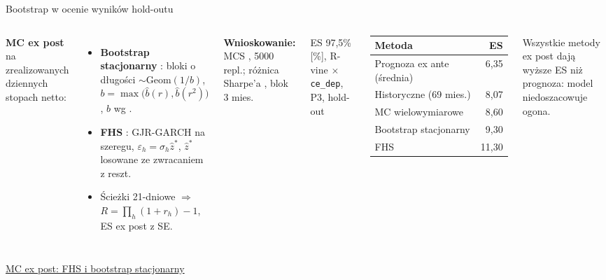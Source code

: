 \documentclass[aspectratio=169,11pt]{beamer}
\newcommand{\repo}{https://github.com/michalmarchwiak/bsc-project}
\newcommand{\rev}{9e941db56fde866672b262f5f6725268ce58feb7}
\newcommand{\src}[2]{\vfill{\scriptsize\color{Teal}%
  \href{\repo/blob/\rev/#1}{#2}}}
\begin{document}
\begin{frame}{Bootstrap w ocenie wyników hold-outu}
  \begin{columns}[T,onlytextwidth]
    \textbf{MC ex post} na zrealizowanych dziennych stopach netto:
    \begin{itemize}
      \item \textbf{Bootstrap stacjonarny} \citep{politis1994}: bloki
        o długości \(\sim\mathrm{Geom}(1/b)\),
        \(b=\max\bigl(\hat b(r),\hat b(r^2)\bigr)\),
        \(\hat b\) wg \citet{politis2004}.
      \item \textbf{FHS} \citep{barone1999}: GJR-GARCH na szeregu, \(\varepsilon_h=\sigma_h\hat z^*\),
        \(\hat z^*\) losowane ze zwracaniem z reszt.
      \item Ścieżki 21-dniowe \(\Rightarrow\)
        \(R=\prod_h(1+r_h)-1\), ES ex post z SE.
    \end{itemize}
    {\small\textbf{Wnioskowanie:} MCS \citep{hansen2011}, 5000 repl.;
    różnica Sharpe'a \citep{ledoit2008}, blok 3 mies.\par}
    \centering
    {\small ES 97,5\% [\%], R-vine \(\times\) \texttt{ce\_dep}, P3, hold-out}\par
    \smallskip
    \begin{tabular}{lr}
      \toprule
      Metoda & ES\\
      \midrule
      Prognoza ex ante (średnia) & 6,35\\
      Historyczne (69 mies.)     & 8,07\\
      MC wielowymiarowe          & 8,60\\
      Bootstrap stacjonarny      & 9,30\\
      FHS                        & 11,30\\
      \bottomrule
    \end{tabular}\par
    \smallskip
    \raggedright{\small Wszystkie metody ex post dają wyższe ES
      niż prognoza: model niedoszacowuje ogona.}
  \end{columns}
  \src{src/pf/backtest/expost_mc.py}{MC ex post: FHS i bootstrap stacjonarny}
\end{frame}
\end{document}
